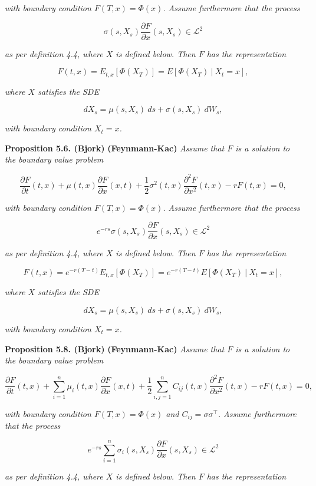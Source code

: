 \documentclass[
]{book}
\begin{document}
\emph{with boundary condition \(F(T,x)=\Phi(x)\). Assume furthermore that the process}

\[
\sigma(s,X_s)\frac{\partial F}{\partial x}(s,X_s) \in \mathcal{L}^2
\]

\emph{as per definition 4.4, where \(X\) is defined below. Then \(F\) has the representation}

\[
F(t,x)=E_{t,x}[\Phi(X_T)]=E[\Phi(X_T)\ \vert\ X_t=x],\tag{5.29}
\]

\emph{where \(X\) satisfies the SDE}

\[
dX_s=\mu(s,X_s)\ ds+\sigma(s,X_s)\ dW_s,\tag{5.30}
\]

\emph{with boundary condition \(X_t=x\).}

\textbf{Proposition 5.6. (Bjork)} \textbf{(Feynmann-Kac)} \emph{Assume that \(F\) is a solution to the boundary value problem}

\[
\frac{\partial F}{\partial t}(t,x)+\mu(t,x)\frac{\partial F}{\partial x}(x,t)+\frac{1}{2}\sigma^2(t,x)\frac{\partial^2 F}{\partial x^2}(t,x)-rF(t,x)=0,\tag{5.34}
\]

\emph{with boundary condition \(F(T,x)=\Phi(x)\). Assume furthermore that the process}

\[
e^{-rs}\sigma(s,X_s)\frac{\partial F}{\partial x}(s,X_s) \in \mathcal{L}^2
\]

\emph{as per definition 4.4, where \(X\) is defined below. Then \(F\) has the representation}

\[
F(t,x)=e^{-r(T-t)}E_{t,x}[\Phi(X_T)]=e^{-r(T-t)}E[\Phi(X_T)\ \vert\ X_t=x],\tag{5.36}
\]

\emph{where \(X\) satisfies the SDE}

\[
dX_s=\mu(s,X_s)\ ds+\sigma(s,X_s)\ dW_s,\tag{5.37}
\]

\emph{with boundary condition \(X_t=x\).}

\textbf{Proposition 5.8. (Bjork)} \textbf{(Feynmann-Kac)} \emph{Assume that \(F\) is a solution to the boundary value problem}

\[
\frac{\partial F}{\partial t}(t,x)+\sum_{i=1}^n\mu_i(t,x)\frac{\partial F}{\partial x}(x,t)+\frac{1}{2}\sum_{i,j=1}^n C_{ij}(t,x)\frac{\partial^2 F}{\partial x^2}(t,x)-rF(t,x)=0,
\]

\emph{with boundary condition \(F(T,x)=\Phi(x)\) and \(C_{ij}=\sigma \sigma^\top\). Assume furthermore that the process}

\[
e^{-rs}\sum_{i=1}^n\sigma_i(s,X_s)\frac{\partial F}{\partial x}(s,X_s) \in \mathcal{L}^2
\]

\emph{as per definition 4.4, where \(X\) is defined below. Then \(F\) has the representation}
\end{document}
